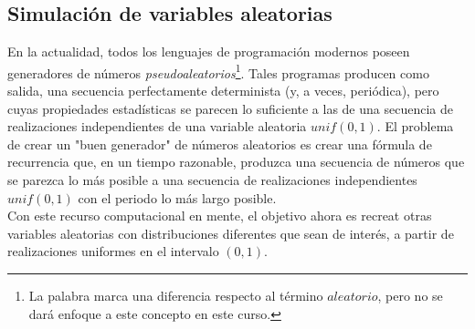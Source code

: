 \documentclass[a4paper]{article}
\numberwithin{equation}{subsection}
\numberwithin{definicion}{subsection}
\begin{document}
\subsection{Simulación de variables aleatorias}
En la actualidad, todos los lenguajes de programación modernos poseen generadores de números \textit{pseudoaleatorios}\footnote{La palabra marca una diferencia respecto al término $aleatorio$, pero no se dará enfoque a este concepto en este curso.}. Tales programas producen como salida, una secuencia perfectamente determinista (y, a veces, periódica), pero cuyas propiedades estadísticas se parecen lo suficiente a las de una secuencia de realizaciones independientes de una variable aleatoria $unif(0,1)$. El problema de crear un "buen generador" de números aleatorios es crear una fórmula de recurrencia que, en un tiempo razonable, produzca una secuencia de números que se parezca lo más posible a una secuencia de realizaciones independientes $unif(0,1)$ con el periodo lo más largo posible.\\ Con este recurso computacional en mente, el objetivo ahora es recreat otras variables aleatorias con distribuciones diferentes que sean de interés, a partir de realizaciones uniformes en el intervalo $(0,1)$.
\end{document}

